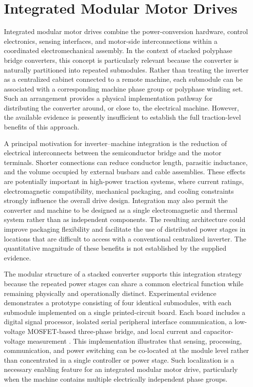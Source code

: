 \section{Integrated Modular Motor Drives}

Integrated modular motor drives combine the power-conversion hardware, control electronics, sensing interfaces, and motor-side interconnections within a coordinated electromechanical assembly. In the context of stacked polyphase bridge converters, this concept is particularly relevant because the converter is naturally partitioned into repeated submodules. Rather than treating the inverter as a centralized cabinet connected to a remote machine, each submodule can be associated with a corresponding machine phase group or polyphase winding set. Such an arrangement provides a physical implementation pathway for distributing the converter around, or close to, the electrical machine. However, the available evidence is presently insufficient to establish the full traction-level benefits of this approach. %

A principal motivation for inverter--machine integration is the reduction of electrical interconnects between the semiconductor bridge and the motor terminals. Shorter connections can reduce conductor length, parasitic inductance, and the volume occupied by external busbars and cable assemblies. These effects are potentially important in high-power traction systems, where current ratings, electromagnetic compatibility, mechanical packaging, and cooling constraints strongly influence the overall drive design. Integration may also permit the converter and machine to be designed as a single electromagnetic and thermal system rather than as independent components. The resulting architecture could improve packaging flexibility and facilitate the use of distributed power stages in locations that are difficult to access with a conventional centralized inverter. The quantitative magnitude of these benefits is not established by the supplied evidence. %

The modular structure of a stacked converter supports this integration strategy because the repeated power stages can share a common electrical function while remaining physically and operationally distinct. Experimental evidence demonstrates a prototype consisting of four identical submodules, with each submodule implemented on a single printed-circuit board. Each board includes a digital signal processor, isolated serial peripheral interface communication, a low-voltage MOSFET-based three-phase bridge, and local current and capacitor-voltage measurement \cite{Jin2017}. This implementation illustrates that sensing, processing, communication, and power switching can be co-located at the module level rather than concentrated in a single controller or power stage. Such localization is a necessary enabling feature for an integrated modular motor drive, particularly when the machine contains multiple electrically independent phase groups.

